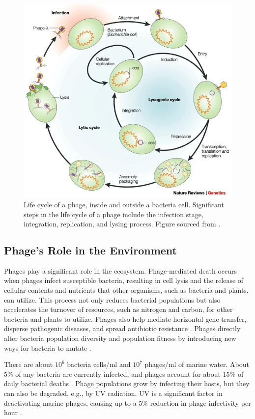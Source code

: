 \begin{figure}
    \centering
    \includegraphics[width=0.5\linewidth]{Figures/phage_life_cycle.png}
    \caption{Life cycle of a phage, inside and outside a bacteria cell. Significant steps in the life cycle of a phage include the infection stage, integration, replication, and lysing process. Figure sourced from \citet{campbellFutureBacteriophageBiology2003}. }
    \label{fig:phage_life_cycle}
\end{figure}

\subsection{Phage's Role in the Environment}
Phages play a significant role in the ecosystem. 
Phage-mediated death occurs when phages infect susceptible bacteria, resulting in cell lysis and the release of cellular contents and nutrients that other organisms, such as bacteria and plants, can utilize. 
This process not only reduces bacterial populations but also accelerates the turnover of resources, such as nitrogen and carbon, for other bacteria and plants to utilize. 
Phages also help mediate horizontal gene transfer, disperse pathogenic diseases, and spread antibiotic resistance \cite{al-shayebCladesHugePhages2020}. 
Phages directly alter bacteria population diversity and population fitness by introducing new ways for bacteria to mutate \cite{brownEcologicalFunctionalRoles2022}. 

There are about $10^6$ bacteria cells/ml and $10^7$ phages/ml of marine water. 
About 5\% of any bacteria are currently infected, and phages account for about 15\% of daily bacterial deaths \cite{chibani-chennoufiPhageHostInteractionEcological2004}. 
Phage populations grow by infecting their hosts, but they can also be degraded, e.g., by UV radiation. 
UV is a significant factor in deactivating marine phages, causing up to a 5\% reduction in phage infectivity per hour \cite{chibani-chennoufiPhageHostInteractionEcological2004}. 

